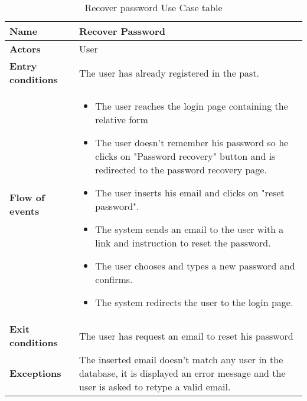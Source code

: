\begin{table}[!htbp]
	\centering
	\begin{tabular}{lp{8cm}}
		\bf\large Name&\bf\large Recover Password \\
		\hline
		\hline
		\bf Actors&User\\
		\hline
		\bf Entry conditions&The user has already registered in the past.\\
		\hline
		\bf Flow of events&
		\begin{itemize}
			\item The user reaches the login page containing the relative form
			\item The user doesn't remember his password so he clicks on "Password recovery" button and is redirected to the password recovery page.
			\item The user inserts his email and clicks on "reset password".
			\item The system sends an email to the user with a link and instruction to reset the password.
			\item The user chooses and types a new password and confirms.
			\item The system redirects the user to the login page.
		\end{itemize}
		\\
		\hline
		\bf Exit conditions&The user has request an email to reset his password \\
		\hline
		\bf Exceptions&The inserted email doesn't match any user in the database, it is displayed an error message and the user is asked to retype a valid email.\\
		\hline
		
	\end{tabular}
	\caption{Recover password Use Case table} \label{tab:recoverpassword}
\end{table}